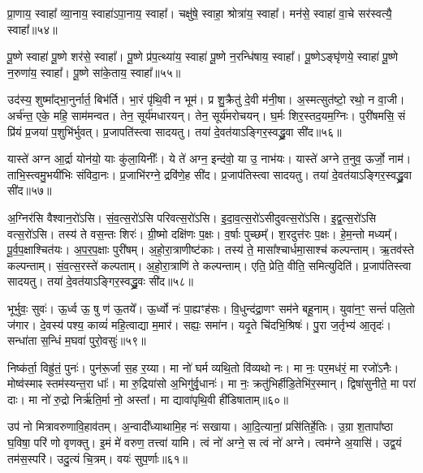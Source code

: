प्रा॒णाय॒ स्वाहा᳚ व्या॒नाय॒ स्वाहा॑ऽपा॒नाय॒ स्वाहा᳚। 
चक्षु॑षे॒ स्वाहा॒ श्रोत्रा॑य॒ स्वाहा᳚। 
मन॑से॒ स्वाहा॑ वा॒चे सर॑स्वत्यै॒ स्वाहा᳚॥५४॥%
\anuvakamend

पू॒ष्णे स्वाहा॑ पू॒ष्णे शर॑से॒ स्वाहा᳚। 
पू॒ष्णे प्र॑प॒त्थ्या॑य॒ स्वाहा॑ पू॒ष्णे न॒रन्धि॑षाय॒ स्वाहा᳚। 
पू॒ष्णेऽङ्घृ॑णये॒ स्वाहा॑ पू॒ष्णे न॒रुणा॑य॒ स्वाहा᳚। 
पू॒ष्णे सा॑के॒ताय॒ स्वाहा᳚॥५५॥
\anuvakamend


उद॑स्य॒ शुष्मा᳚द्भा॒नुर्नार्त॒ बिभ॑र्ति। 
भा॒रं पृ॑थि॒वी न भूम॑। 
प्र शु॒क्रैतु॑ दे॒वी म॑नी॒षा। 
अ॒स्मत्सुत॑ष्टो॒ रथो॒ न वा॒जी। 
अर्च॑न्त॒ एके॒ महि॒ साम॑मन्वत। 
तेन॒ सूर्य॑मधारयन्। 
तेन॒ सूर्य॑मरोचयन्। 
घ॒र्मः  शिर॒स्तद॒यम॒ग्निः। 
पुरी॑षमसि॒ सं प्रि॑यं प्र॒जया॑ प॒शुभि॑र्भुवत्। 
प्र॒जापति॑स्त्वा सादयतु। 
तया॑ दे॒वत॑याऽङ्गिर॒स्वद्ध्रु॒वा सी॑द॥५६॥
\anuvakamend

यास्ते॑ अग्न आ॒र्द्रा योन॑यो॒ याः कु॑ला॒यिनीः᳚। 
ये ते॑ अग्न॒ इन्द॑वो॒ या उ॒ नाभ॑यः। 
यास्ते॑ अग्ने त॒नुव॒ ऊर्जो॒ नाम॑। 
ताभि॒स्त्वमु॒भयी॑भिः संविदा॒नः। 
प्र॒जाभि॑रग्ने॒ द्रवि॑णे॒ह सी॑द। 
प्र॒जाप॑तिस्त्वा सादयतु। 
तया॑ दे॒वत॑याऽङ्गिर॒स्वद्ध्रु॒वा सी॑द॥५७॥
\anuvakamend

अ॒ग्निर॑सि वैश्वान॒रो॑ऽसि। 
सं॒व॒त्स॒रो॑ऽसि परिवत्स॒रो॑ऽसि। 
इ॒दा॒व॒त्स॒रो॑ऽसीदुवत्स॒रो॑ऽसि। 
इ॒द्व॒त्स॒रो॑ऽसि वत्स॒रो॑ऽसि। 
तस्य॑ ते वस॒न्तः  शिरः॑। 
ग्री॒ष्मो दक्षि॑णः प॒क्षः। 
व॒र्\mbox{}षाः पुच्छम्᳚। 
श॒रदुत्त॑रः प॒क्षः। 
हे॒म॒न्तो मध्यम्᳚। 
पू॒र्व॒प॒क्षाश्चित॑यः। 
अ॒प॒र॒प॒क्षाः पुरी॑षम्। 
अ॒हो॒रा॒त्राणीष्ट॑काः। 
तस्य॑ ते॒ मासा᳚श्चार्धमा॒साश्च॑ कल्पन्ताम्। 
ऋ॒तव॑स्ते कल्पन्ताम्। 
सं॒व॒त्स॒रस्ते॑ कल्पताम्। 
अ॒हो॒रा॒त्राणि॑ ते कल्पन्ताम्। 
एति॒ प्रेति॒ वीति॒ समित्युदिति॑। 
प्र॒जाप॑तिस्त्वा सादयतु। 
तया॑ दे॒वत॑याऽङ्गिर॒स्वद्ध्रु॒वः सी॑द॥५८॥
\anuvakamend[चित॑यो॒ नव॑ च]


भूर्भुवः॒ सुवः॑। 
ऊ॒र्ध्व ऊ॒ षु ण॑ ऊ॒तये᳚। 
ऊ॒र्ध्वो नः॑ पा॒ह्यꣳह॑सः। 
वि॒धुन्द॑द्रा॒णꣳ सम॑ने बहू॒नाम्। 
युवा॑न॒ꣳ॒ सन्तं॑ पलि॒तो ज॑गार। 
दे॒वस्य॑ पश्य॒ काव्यं॑ महि॒त्वाद्या म॒मार॑। 
सह्यः॒ समा॑न। 
यदृ॒ते चि॑दभि॒श्रिषः॑। 
पु॒रा ज॒र्तृभ्य॑ आ॒तृदः॑। 
सन्धा॑ता स॒न्धिं म॒घवा॑ पुरो॒वसुः॑॥५९॥

निष्क॑र्ता॒ विह्रु॑तं॒ पुनः॑। 
पुन॑रू॒र्जा स॒ह र॒य्या। 
मा नो॑ घर्म व्यथि॒तो वि॑व्यथो नः। 
मा नः॒ पर॒मध॑रं॒ मा रजो॑ऽनैः। 
मोष्व॑स्माꣴ स्तम॑स्यन्त॒रा धाः᳚। 
मा रु॒द्रिया॑सो अ॒भिगु॑र्वृ॒धानः॑। 
मा नः॒ क्रतु॑भिर्\mbox{}हीडि॒तेभि॑र॒स्मान्। 
द्विषा॑सुनीते॒ मा परा॑ दाः। 
मा नो॑ रु॒द्रो निर्\mbox{}ऋ॑ति॒र्मा नो॒ अस्ता᳚। 
मा द्यावा॑पृथि॒वी ही॑डिषाताम्॥६०॥

उप॑ नो मित्रावरुणावि॒हाव॑तम्। 
अ॒न्वादी᳚ध्याथामि॒ह नः॑ सखाया। 
आ॒दि॒त्यानां॒ प्रसि॑तिर्\mbox{}हे॒तिः। 
उ॒ग्रा श॒तापा᳚ष्ठा घ॒विषा॒ परि॑ णो वृणक्तु। 
इ॒मं मे॑ वरुण॒ तत्त्वा॑ यामि। 
त्वं नो॑ अग्ने॒ स त्वं नो॑ अग्ने। 
त्वम॑ग्ने अ॒यासि॑। 
उद्व॒यं तम॑स॒स्परि॑। 
उदु॒त्यं चि॒त्रम्। 
वयः॑ सुप॒र्णाः॥६१॥
\anuvakamend[पु॒रो॒वसु॑र्\mbox{}हीडिषाताꣳ सुप॒र्णाः]


